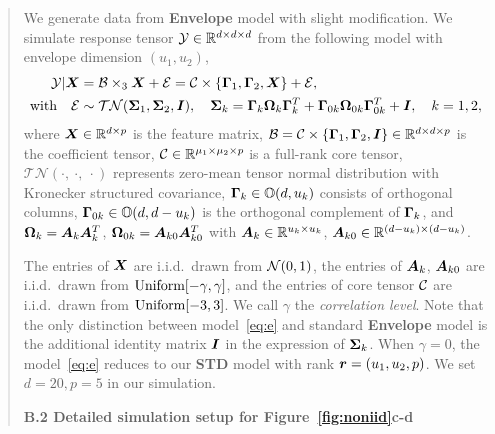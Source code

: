 \documentclass[11pt]{article}
\theoremstyle{plain}
\theoremstyle{definition}
\begin{document}
\begin{enumerate}[wide, labelwidth=!, labelindent=0pt]
\begin{enumerate}[wide, labelwidth=!, labelindent=0pt]
\begin{quote}
    \vspace{0.2cm}
    
    We generate data from \textbf{Envelope} model \citep{li2017parsimonious} with slight modification. We simulate response tensor $\mathcal{Y}\in\mathbb{R}^{d\times d\times d}$ from the following model with envelope dimension $(u_1, u_2)$,
\begin{align}\label{eq:e}
    \mathcal{Y}|\bm X &= \mathcal{B} \times_3 \bm X + \mathcal{E} = \mathcal{C} \times \{\bm{\Gamma}_1, \bm{\Gamma}_2,\bm X\}+ \mathcal{E}, \notag \\
    \text{with} \quad \mathcal{E} &\sim \mathcal{TN}(\bm \Sigma_1, \bm \Sigma_2, \bm I), \quad \bm \Sigma_k = \bm{\Gamma}_k \bm \Omega_k \bm{\Gamma}_k^T + \bm{\Gamma}_{0k} \bm \Omega_{0k} \bm{\Gamma}_{0k}^T+\bm I, \quad k = 1,2,
\end{align}
 where $\bm X\in\mathbb{R}^{d\times p}$ is the feature matrix, $\mathcal{B}=\mathcal{C}\times\{\bm{\Gamma}_1,\bm{\Gamma}_2, \bm I\}\in \mathbb{R}^{d\times d\times p}$ is the coefficient tensor, $\mathcal{C}\in\mathbb{R}^{\mu_1\times \mu_2\times p}$ is a full-rank core tensor, $\mathcal{TN}(\cdot,\ \cdot,\ \cdot)$ represents zero-mean tensor normal distribution with Kronecker structured covariance, 
 $\bm{\Gamma}_{k} \in \mathbb{O}(d,u_k)$ 
 consists of orthogonal columns, $\bm{\Gamma}_{0k} \in \mathbb{O}(d,d-u_k)$ is the orthogonal complement of $\bm{\Gamma}_k$, and  $\bm \Omega_k = \bm A_k\bm A_k^T$, $\bm \Omega_{0k} = \bm A_{k0}\bm A_{k0}^T$ with $\bm A_k \in \mathbb{R}^{u_k \times u_k}$,  $\bm A_{k0} \in \mathbb{R}^{(d - u_k) \times (d - u_k)}$. 
 
 The entries of $\bm X$ are i.i.d.\ drawn from $\mathcal{N}(0,1)$, the entries of $\bm A_k$, $\bm A_{k0}$ are i.i.d.\ drawn from $\textup{Uniform}[-\gamma, \gamma]$, and the entries of core tensor $\mathcal{C}$ are i.i.d.\ drawn from $\textup{Uniform}[-3,  3]$. We call $\gamma$ the \textit{correlation level}. Note that the only distinction between model~\eqref{eq:e} and standard {\bf Envelope} model is the additional identity matrix $\bm I$ in the expression of $\bm \Sigma_k$. When $\gamma = 0$, the model~\eqref{eq:e} reduces to our \textbf{STD} model with rank $\bm{r} = (u_1,u_2,p)$. We set $d=20, p=5$ in our simulation.  
 
 \vspace{0.2cm}
 \textbf{B.2 Detailed simulation setup for Figure~\ref{fig:noniid}c-d}
 
 \vspace{0.2cm}
 

\end{quote}
\end{enumerate}
\end{enumerate}
\end{document}
